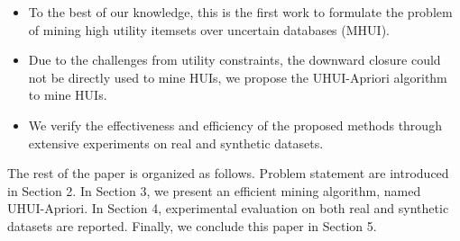 \documentclass[conference]{IEEEtran}
\begin{document}
\begin{itemize}
\vspace{-0.2cm}
\item	To the best of our knowledge, this is the first work to formulate the problem of mining high utility itemsets over uncertain databases (MHUI).
\item   Due to the challenges from utility constraints, the downward closure could not be directly used to mine HUIs, we propose the UHUI-Apriori algorithm to mine HUIs.
\item   We verify the effectiveness and efficiency of the proposed methods through extensive experiments on real and synthetic datasets.
\vspace{-0.2cm}
\end{itemize}

The rest of the paper is organized as follows. Problem statement are introduced in Section 2. In Section 3, we present an efficient mining algorithm, named UHUI-Apriori. In Section 4, experimental evaluation on both real and synthetic datasets are reported. Finally, we conclude this paper in Section 5.




%
%

\end{document}

